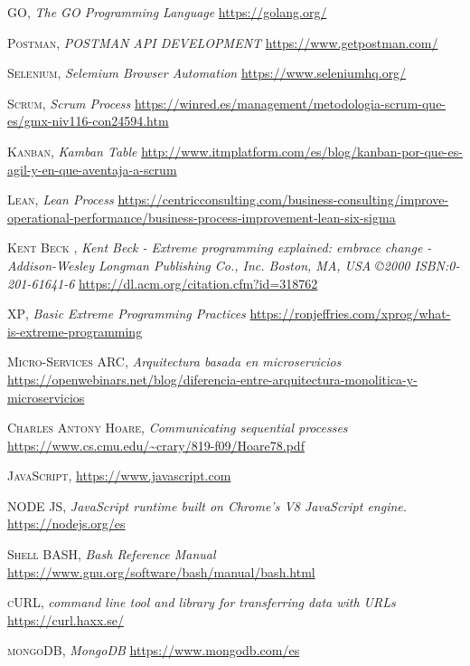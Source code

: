 \documentclass[a4paper,11pt]{book}
\begin{document}
\begin{thebibliography}{aaaa}


 \textsc{GO},
\textit{The GO Programming Language}
\url{https://golang.org/} 


 \textsc{Postman},
\textit{POSTMAN API DEVELOPMENT}
\url{https://www.getpostman.com/} 

 \textsc{Selenium},
\textit{Selemium Browser Automation}
\url{https://www.seleniumhq.org/} 

 \textsc{Scrum},
\textit{Scrum Process}
\url{https://winred.es/management/metodologia-scrum-que-es/gmx-niv116-con24594.htm} 

 \textsc{Kanban},
\textit{Kamban Table}
\url{http://www.itmplatform.com/es/blog/kanban-por-que-es-agil-y-en-que-aventaja-a-scrum} 

 \textsc{Lean},
\textit{Lean Process}
\url{https://centricconsulting.com/business-consulting/improve-operational-performance/business-process-improvement-lean-six-sigma} 

 \textsc{	Kent Beck	},
\textit{Kent Beck - Extreme programming explained: embrace change -Addison-Wesley Longman Publishing Co., Inc. Boston, MA, USA ©2000 ISBN:0-201-61641-6	}
\url{https://dl.acm.org/citation.cfm?id=318762} 

 \textsc{XP},
\textit{Basic Extreme Programming Practices}
\url{https://ronjeffries.com/xprog/what-is-extreme-programming} 


 \textsc{Micro-Services ARC},
\textit{Arquitectura basada en microservicios}
\url{https://openwebinars.net/blog/diferencia-entre-arquitectura-monolitica-y-microservicios} 

 \textsc{Charles Antony Hoare},
\textit{Communicating sequential processes}
\url{https://www.cs.cmu.edu/~crary/819-f09/Hoare78.pdf}

 \textsc{JavaScript},
\textit{}
\url{https://www.javascript.com}

 \textsc{NODE JS},
\textit{JavaScript runtime built on Chrome's V8 JavaScript engine.}
\url{https://nodejs.org/es}

 \textsc{Shell BASH},
\textit{Bash Reference Manual}
\url{https://www.gnu.org/software/bash/manual/bash.html}

 \textsc{cURL},
\textit{command line tool and library for transferring data with URLs}
\url{https://curl.haxx.se/}

 \textsc{mongoDB},
\textit{MongoDB }
\url{https://www.mongodb.com/es}


\end{thebibliography}
\end{document}
